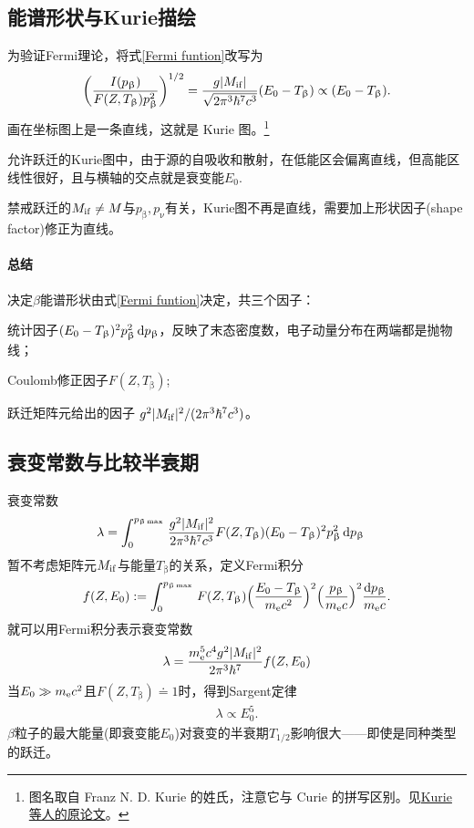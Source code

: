 \subsection{\betaray 能谱形状与Kurie描绘}

为验证Fermi理论，将式\eqref{Fermi funtion}改写为
\begin{equation}\label{eq:nrd-kurie-relation}
	\biggl(\frac{I(p_\upbeta)}{F(Z,T_\upbeta)p_\upbeta^2}\biggr)^{1/2} = \frac{g\lvert M_{\mathrm i\mathrm f}\rvert}{\sqrt{2\pi^3\hbar^7c^3}}(E_0 - T_\upbeta) \propto (E_0 - T_\upbeta).
\end{equation}
画在坐标图上是一条直线，这就是 Kurie 图。\footnote{图名取自 Franz N. D. Kurie 的姓氏，注意它与 Curie 的拼写区别。见\href{https://doi.org/10.1103/PhysRev.49.368}{Kurie 等人的原论文}。}

允许跃迁的Kurie图中，由于源的自吸收和散射，在低能区会偏离直线，但高能区线性很好，且与横轴的交点就是衰变能$E_0.$

禁戒跃迁的$M_{\mathrm i\mathrm f} \neq M$与$p_\upbeta,p_\upnu$有关，Kurie图不再是直线，需要加上形状因子(shape factor)修正为直线。
\paragraph{总结}决定$\beta$能谱形状由式\eqref{Fermi funtion}决定，共三个因子：
\begin{compactenum}
	\item 统计因子$(E_0 - T_\upbeta)^2p_\upbeta^2\mathop{}\!\mathrm{d} p_\upbeta$，反映了末态密度数，电子动量分布在两端都是抛物线；
	\item Coulomb修正因子$F(Z,T_\upbeta)$;
	\item 跃迁矩阵元给出的因子 $g^2\lvert M_{\mathrm i\mathrm f}\rvert^2/(2\pi^3\hbar^7c^3)$。
\end{compactenum}

\subsection{衰变常数与比较半衰期}

衰变常数
\begin{align*}
	\lambda &= \int_0^{p_{\upbeta\max{}}}\frac{g^2\lvert M_{\mathrm i\mathrm f}\rvert^2}{2\pi^3\hbar^7c^3}F(Z,T_\upbeta)(E_0 - T_\upbeta)^2p_\upbeta^2\mathop{}\!\mathrm{d} p_\upbeta
\end{align*}
暂不考虑矩阵元$M_{\mathrm i\mathrm f}$与能量$T_\upbeta$的关系，定义Fermi积分
\begin{align}
	f(Z,E_0) := \int_0^{p_{\upbeta\max{}}}F(Z,T_\upbeta)\Bigl(\frac{E_0 - T_\upbeta}{m_{\mathrm{e}} c^2}\Bigr)^2\Bigl(\frac{p_\upbeta}{m_{\mathrm{e}} c}\Bigr)^2\frac{\mathop{}\!\mathrm{d} p_\upbeta}{m_{\mathrm{e}} c}.
\end{align}
就可以用Fermi积分表示衰变常数
\begin{equation}\label{eq:nrd-beta-decay-rate-from-fermi-integral}
	\lambda = \frac{m_{\mathrm{e}}^5c^4g^2\lvert M_{\mathrm i\mathrm f}\rvert^2}{2\pi^3\hbar^7}f(Z,E_0)
\end{equation}
当$E_0 \gg m_{\mathrm{e}} c^2$且$F(Z,T_\upbeta) \doteq 1$时，得到Sargent定律
\begin{align}
	\lambda \propto E_0^5.
\end{align}
$\beta$粒子的最大能量(即衰变能$E_0$)对衰变的半衰期$T_{1/2}$影响很大——即使是同种类型的跃迁。
